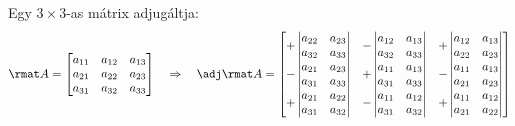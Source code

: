 \documentclass[a4paper, 12pt]{scrartcl}
\begin{document}
\begin{blueBox}
  Egy $3 \times 3$-as mátrix adjugáltja:
  $$
    \rmat A = \begin{bmatrix}
      a_{11} & a_{12} & a_{13} \\
      a_{21} & a_{22} & a_{23} \\
      a_{31} & a_{32} & a_{33}
    \end{bmatrix}
    \quad
    \Rightarrow
    \quad
    \adj \rmat A = \begin{bmatrix}
      + \begin{vmatrix}
          a_{22} & a_{23} \\
          a_{32} & a_{33}
        \end{vmatrix}
       &
      - \begin{vmatrix}
          a_{12} & a_{13} \\
          a_{32} & a_{33}
        \end{vmatrix}
       &
      +\begin{vmatrix}
         a_{12} & a_{13} \\
         a_{22} & a_{23}
       \end{vmatrix}
      \\
      - \begin{vmatrix}
          a_{21} & a_{23} \\
          a_{31} & a_{33}
        \end{vmatrix}
       &
      + \begin{vmatrix}
          a_{11} & a_{13} \\
          a_{31} & a_{33}
        \end{vmatrix}
       &
      - \begin{vmatrix}
          a_{11} & a_{13} \\
          a_{21} & a_{23}
        \end{vmatrix}
      \\
      + \begin{vmatrix}
          a_{21} & a_{22} \\
          a_{31} & a_{32}
        \end{vmatrix}
       &
      - \begin{vmatrix}
          a_{11} & a_{12} \\
          a_{31} & a_{32}
        \end{vmatrix}
       &
      +\begin{vmatrix}
         a_{11} & a_{12} \\
         a_{21} & a_{22}
       \end{vmatrix}
    \end{bmatrix}
  $$
\end{blueBox}
\end{document}
